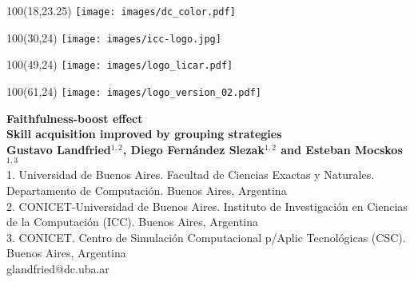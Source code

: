 \documentclass[a0,portrait]{a0poster}
\begin{document}
\begin{textblock}{100}(18,23.25)
 \texttt{[image: images/dc\_color.pdf]} 
 \end{textblock}
\begin{textblock}{100}(30,24)
 \texttt{[image: images/icc-logo.jpg]} 
 \end{textblock}
 \begin{textblock}{100}(49,24)
 \texttt{[image: images/logo\_licar.pdf]} 
 \end{textblock}
  \begin{textblock}{100}(61,24)
 \texttt{[image: images/logo\_version\_02.pdf]} 
 \end{textblock}
 

\centering \fontsize{90}{90} \textbf{Faithfulness-boost effect} \\[1cm]  %
\fontsize{70}{85}\textbf{Skill acquisition improved by grouping strategies}\\[2cm] %
\LARGE \textbf{Gustavo Landfried$^{1,2}$, Diego Fern\'andez Slezak$^{1,2}$ and Esteban Mocskos$^{1,3}$}\\[0.5cm] %
\large 1. Universidad de Buenos Aires. Facultad de Ciencias Exactas y Naturales. Departamento de Computaci\'on. Buenos Aires, Argentina \\ %
\large 2. CONICET-Universidad de Buenos Aires. Instituto de Investigaci\'on en Ciencias de la Computaci\'on (ICC). Buenos Aires, Argentina \\
\large 3. CONICET. Centro de Simulaci\'on Computacional p/Aplic Tecnol\'ogicas (CSC). Buenos Aires, Argentina \\ [0cm]
\Large glandfried@dc.uba.ar


\vspace{4cm}
\end{document}
